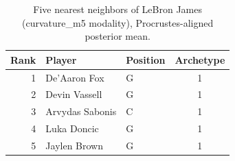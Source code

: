\begin{table}[htbp]
  \centering\small
  \begin{tabular}{rllc}
    \toprule
    Rank & Player & Position & Archetype \\
    \midrule
    1 & De'Aaron Fox & G & 1 \\
    2 & Devin Vassell & G & 1 \\
    3 & Arvydas Sabonis & C & 1 \\
    4 & Luka Doncic & G & 1 \\
    5 & Jaylen Brown & G & 1 \\
    \bottomrule
  \end{tabular}
  \caption{Five nearest neighbors of LeBron James (curvature_m5 modality), Procrustes-aligned posterior mean.}
  \label{tab:LeBron_James_neighbors_curvature_m5}
\end{table}

